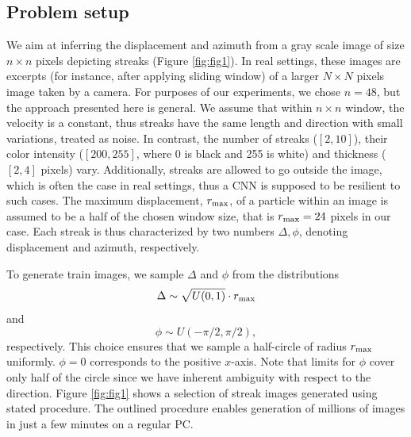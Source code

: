 \documentclass{svjour3}                     %
\begin{document}
\subsection{Problem setup}

We aim at inferring the displacement and azimuth from a gray scale image of size $n \times n$ pixels depicting streaks (Figure \ref{fig:fig1}). In real settings, these images are excerpts (for instance, after applying sliding window) of a larger $N \times N$ pixels image taken by a camera. For purposes of our experiments, we chose $n = 48$, but the approach presented here is general. We assume that within $n \times n$ window, the velocity is a constant, thus streaks have the same length and direction with small variations, treated as noise. In contrast, the number of streaks ($[2, 10]$), their color intensity ($[200, 255]$, where 0 is black and 255 is white) and thickness ($[2, 4]$ pixels) vary. Additionally, streaks are allowed to go outside the image, which is often the case in real settings, thus a CNN is supposed to be resilient to such cases. The maximum displacement, $r_\textnormal{max}$, of a particle within an image is assumed to be a half of the chosen window size, that is $r_\textnormal{max} = 24$ pixels in our case. Each streak is thus characterized by two numbers $\Delta, \phi$, denoting displacement and azimuth, respectively. 

To generate train images, we sample $\Delta$ and $\phi$ from the distributions
\begin{equation}
\Delta \sim \sqrt{U(0, 1)} \cdot r_\textnormal{max}
\end{equation}
and
\begin{equation}
\phi \sim U(-\pi/2, \pi/2),
\end{equation}
respectively. This choice ensures that we sample a half-circle of radius $r_\textnormal{max}$ uniformly. $\phi = 0$ corresponds to the positive $x$-axis. Note that limits for $\phi$ cover only half of the circle since we have inherent ambiguity with respect to the direction. Figure \ref{fig:fig1} shows a selection of streak images generated using stated procedure. The outlined procedure enables generation of millions of images in just a few minutes on a regular PC. 
\end{document}
